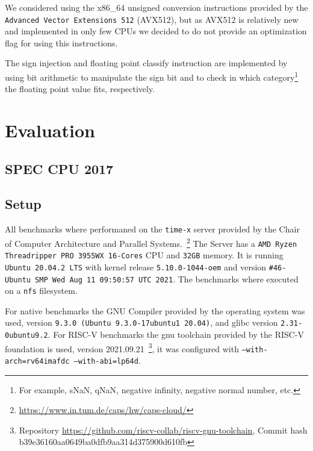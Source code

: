 \documentclass[course=eragp]{aspdoc}
\begin{document}
\par

We considered using the x86\_64 unsigned conversion instructions provided by the \texttt{Advanced
    Vector Extensions 512} (AVX512), but as AVX512 is relatively new and implemented in only few CPUs we
decided to do not provide an optimization flag for using this instructions.

\par

The sign injection and floating point classify instruction are implemented by using bit arithmetic
to manipulate the sign bit and to check in which category\footnote{For example, sNaN, qNaN, negative
    infinity, negative normal number, etc.} the floating point value fits, respectively.

\section{Evaluation}\label{sec:evaluation}

\subsection{SPEC CPU 2017}

\subsection{Setup}

All benchmarks where performaned on the \texttt{time-x} server provided by the Chair of Computer Architecture and Parallel Systems.~\footnote{\url{https://www.in.tum.de/caps/hw/caps-cloud/}} %
The Server has a \texttt{AMD Ryzen Threadripper PRO 3955WX 16-Cores} CPU and \texttt{32GB} memory. %
It is running \texttt{Ubuntu 20.04.2 LTS} with kernel release \texttt{5.10.0-1044-oem} and version \texttt{\#46-Ubuntu SMP Wed Aug 11 09:50:57 UTC 2021}.
The benchmarks where executed on a \texttt{nfs} filesystem.

For native benchmarks the GNU Compiler provided by the operating system was used,
version \texttt{9.3.0 (Ubuntu 9.3.0-17ubuntu1~20.04)}, and glibc version \texttt{2.31-0ubuntu9.2}.
For RISC-V benchmarks the gnu toolchain provided by the RISC-V foundation is used, version 2021.09.21~\footnote{Repository \url{https://github.com/riscv-collab/riscv-gnu-toolchain}, Commit hash b39e36160aa0649ba0dfb9aa314d375900d610fb},
it was configured with \texttt{--with-arch=rv64imafdc --with-abi=lp64d}.
\end{document}
